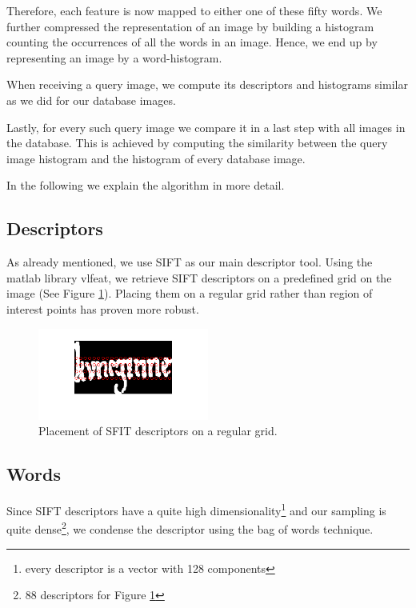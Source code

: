\documentclass[conference]{IEEEtran}
\begin{document}
Therefore, each feature is now mapped to either one of these fifty words. We further compressed the representation of an image by building a histogram counting the occurrences of all the words in an image. Hence, we end up by representing an image by a word-histogram.

When receiving a query image, we compute its descriptors and histograms similar as we did for our database images. 

Lastly, for every such query image we compare 
it in a last step with all images in the database. This is achieved by computing the similarity between the query image histogram and the histogram of every database image.

In the following we explain the algorithm in more detail.

\subsection{Descriptors}
\label{sub:descriptors}
As already mentioned, we use SIFT as our main descriptor tool. 
Using the matlab library vlfeat\cite{vedaldi08vlfeat}, 
we retrieve SIFT descriptors on a predefined grid on the image (See Figure \ref{fig:SIFT}). 
Placing them on a regular grid rather than region of interest points
has proven more robust.

\begin{figure}[!t]
\centering
\includegraphics[width=0.5\textwidth]{descriptor_placement}
\caption{Placement of SFIT descriptors on a regular grid.}
\label{fig:SIFT}
\end{figure}

\subsection{Words}
\label{sub:words}
Since SIFT descriptors have a quite high dimensionality\footnote{ every descriptor is a vector with 128 components}
and our sampling is quite dense\footnote{88 descriptors for Figure \ref{fig:SIFT}}, we condense the
descriptor using the bag of words technique. 
\end{document}

